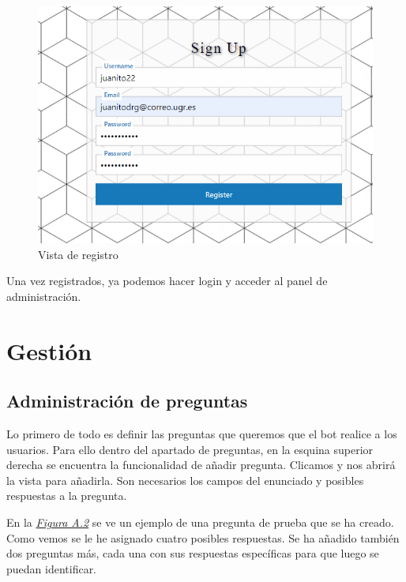 \begin{figure}[!ht]
    \centering
    \includegraphics[width=1\textwidth]{imagenes/registro_a.png}
    \caption{ Vista de registro }
    \label{fig:vista-registro}
\end{figure}\vspace{0.5cm}

Una vez registrados, ya podemos hacer login y acceder al panel de administración.\vspace{0.5cm}

\section{Gestión}\vspace{0.5cm}

\subsection{Administración de preguntas}\vspace{0.5cm}

Lo primero de todo es definir las preguntas que queremos que el bot realice a los usuarios. Para ello dentro del apartado de preguntas, en la esquina superior derecha se encuentra la funcionalidad de añadir pregunta. Clicamos y nos abrirá la vista para añadirla. Son necesarios los campos del enunciado y posibles respuestas a la pregunta. 

En la \textit{\hyperref[fig:creacion_pregunta]{Figura A.2}} se ve un ejemplo de una pregunta de prueba que se ha creado. Como vemos se le he asignado cuatro posibles respuestas. Se ha añadido también dos preguntas más, cada una con sus respuestas específicas para que luego se puedan identificar.
\vspace{0.5cm}

